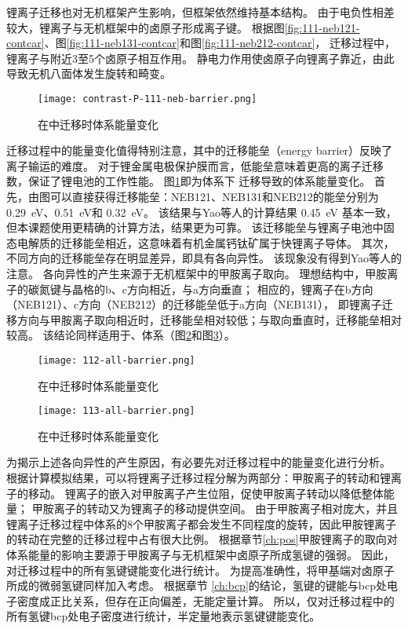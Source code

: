 锂离子迁移也对无机框架产生影响，但框架依然维持基本结构。
由于电负性相差较大，锂离子与无机框架中的卤原子形成离子键。
根据图\ref{fig:111-neb121-contcar}、图\ref{fig:111-neb131-contcar}和图\ref{fig:111-neb212-contcar}，
迁移过程中，锂离子与附近3至5个卤原子相互作用。
静电力作用使卤原子向锂离子靠近，由此导致无机八面体发生旋转和畸变。

\begin{figure}[htbp]
    \centering
    \texttt{[image: contrast-P-111-neb-barrier.png]}
    \caption{在中迁移时体系能量变化}
    \label{fig:111-barrier}
\end{figure}

迁移过程中的能量变化值得特别注意，其中的迁移能垒（energy barrier）反映了离子输运的难度。
对于锂金属电极保护膜而言，低能垒意味着更高的离子迁移数，保证了锂电池的工作性能。
图\ref{fig:111-barrier}即为体系下 迁移导致的体系能量变化。
首先，由图可以直接获得迁移能垒：NEB121、NEB131和NEB212的能垒分别为 \SI{0.29}{eV}、\SI{0.51}{eV}和 \SI{0.32}{eV}。
该结果与Yao等人的计算结果 \SI{0.45}{eV} 基本一致，但本课题使用更精确的计算方法，结果更为可靠。
该迁移能垒与锂离子电池中固态电解质的迁移能垒相近，这意味着有机金属钙钛矿属于快锂离子导体。
其次，不同方向的迁移能垒存在明显差异，即具有各向异性。
该现象没有得到Yao等人的注意。
各向异性的产生来源于无机框架中的甲胺离子取向。
理想结构中，甲胺离子的碳氮键与晶格的b、c方向相近，与a方向垂直；
相应的，锂离子在b方向（NEB121）、c方向（NEB212）的迁移能垒低于a方向（NEB131），
即锂离子迁移方向与甲胺离子取向相近时，迁移能垒相对较低；与取向垂直时，迁移能垒相对较高。
该结论同样适用于、体系（图\ref{fig:112-barrier}和图\ref{fig:113-barrier}）。

\begin{figure}[htbp]
    \centering
    \texttt{[image: 112-all-barrier.png]}
    \caption{在中迁移时体系能量变化}
    \label{fig:112-barrier}
\end{figure}

\begin{figure}[htbp]
    \centering
    \texttt{[image: 113-all-barrier.png]}
    \caption{在中迁移时体系能量变化}
    \label{fig:113-barrier}
\end{figure}

为揭示上述各向异性的产生原因，有必要先对迁移过程中的能量变化进行分析。
根据计算模拟结果，可以将锂离子迁移过程分解为两部分：甲胺离子的转动和锂离子的移动。
锂离子的嵌入对甲胺离子产生位阻，促使甲胺离子转动以降低整体能量；
甲胺离子的转动又为锂离子的移动提供空间。
由于甲胺离子相对庞大，并且锂离子迁移过程中体系的8个甲胺离子都会发生不同程度的旋转，因此甲胺锂离子的转动在完整的迁移过程中占有很大比例。
根据章节\ref{ch:pos}甲胺锂离子的取向对体系能量的影响主要源于甲胺离子与无机框架中卤原子所成氢键的强弱。
因此，对迁移过程中的所有氢键键能变化进行统计。
为提高准确性，将甲基端对卤原子所成的微弱氢键同样加入考虑。
根据章节 \ref{ch:bcp}的结论，氢键的键能与bcp处电子密度成正比关系，但存在正向偏差，无能定量计算。
所以，仅对迁移过程中的所有氢键bcp处电子密度进行统计，半定量地表示氢键键能变化。

